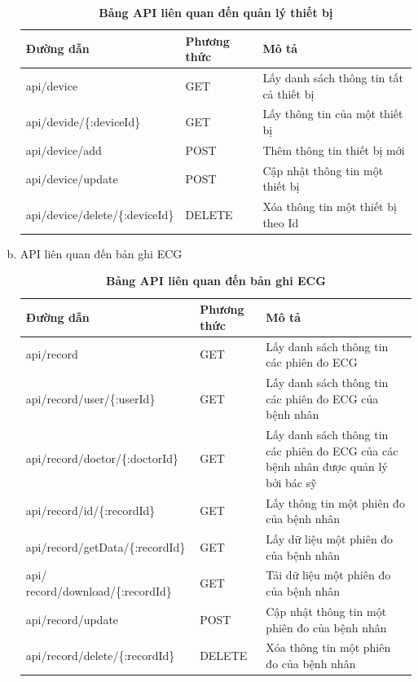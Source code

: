 \begin{enumerate}[a)]
\begin{table}[H]
  \centering
  \caption{\bfseries \fontsize{12pt}{0pt}\selectfont Bảng API liên quan đến quản lý thiết bị}
  \begin{tabularx}{0.9\textwidth}{
  | >{\raggedright\arraybackslash}X
  | >{\raggedright\arraybackslash}m{2cm}
  | >{\raggedright\arraybackslash}X|
  }
  \hline
  \bfseries Đường dẫn    &\bfseries Phương thức    &\bfseries Mô tả\\ \hline
 api/device   &   GET  & Lấy danh sách thông tin tất cả thiết bị \\ \hline
 api/devide/\{:deviceId\}   &    GET    & Lấy thông tin của một thiết bị \\ \hline
 api/device/add &   POST     & Thêm thông tin thiết bị mới \\ \hline
 api/device/update  &     POST   & Cập nhật thông tin một thiết bị \\ \hline
 api/device/delete/\{:deviceId\}  &     DELETE   & Xóa thông tin một thiết bị theo Id \\ \hline

  \end{tabularx}
  \label{table_api_device}
\end{table}

\item API liên quan đến bản ghi ECG


\begin{table}[H]
  \centering
  \caption{\bfseries \fontsize{12pt}{0pt}\selectfont Bảng API liên quan đến bản ghi ECG}
  \begin{tabularx}{0.9\textwidth}{
  | >{\raggedright\arraybackslash}X
  | >{\raggedright\arraybackslash}m{2cm}
  | >{\raggedright\arraybackslash}X|
  }
  \hline
  \bfseries Đường dẫn    &\bfseries Phương thức    &\bfseries Mô tả\\ \hline
 api/record   &   GET  & Lấy danh sách thông tin các phiên đo ECG \\ \hline
 api/record/user/\{:userId\}   &    GET    & Lấy danh sách thông tin các phiên đo ECG của bệnh nhân \\ \hline
 api/record/doctor/\{:doctorId\} &   GET     & Lấy danh sách thông tin các phiên đo ECG của các bệnh nhân được quản lý bởi bác sỹ \\ \hline
 api/record/id/\{:recordId\}  &     GET   & Lấy thông tin một phiên đo của bệnh nhân \\ \hline
 api/record/getData/\{:recordId\}  &     GET   & Lấy dữ liệu một phiên đo của bệnh nhân \\ \hline
 api/ record/download/\{:recordId\}  &     GET   & Tải dữ liệu một phiên đo của bệnh nhân \\ \hline
 api/record/update  &     POST   & Cập nhật thông tin một phiên đo của bệnh nhân \\ \hline
 api/record/delete/\{:recordId\}  &     DELETE   & Xóa thông tin một phiên đo của bệnh nhân \\ \hline


\end{tabularx}
\end{table}
\end{enumerate}
